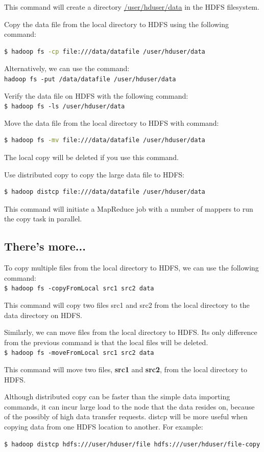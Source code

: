 This command will create a directory \url{/user/hduser/data} in the HDFS filesystem.

Copy the data file from the local directory to HDFS using the following command:
\lstset{style=bashstyle}
\begin{lstlisting}[language=bash]
$ hadoop fs -cp file:///data/datafile /user/hduser/data
\end{lstlisting}

Alternatively, we can use the command: \\
\verb|hadoop fs -put /data/datafile /user/hduser/data|

Verify the data file on HDFS with the following command: \\
\verb|$ hadoop fs -ls /user/hduser/data|

Move the data file from the local directory to HDFS with command:
\lstset{style=bashstyle}
\begin{lstlisting}[language=bash]
$ hadoop fs -mv file:///data/datafile /user/hduser/data
\end{lstlisting}

The local copy will be deleted if you use this command.

Use distributed copy to copy the large data file to HDFS:
\lstset{style=bashstyle}
\begin{lstlisting}[language=bash]
$ hadoop distcp file:///data/datafile /user/hduser/data
\end{lstlisting}
This command will initiate a MapReduce job with a number of mappers to run the copy task in parallel.
\subsection*{There's more...}
To copy multiple files from the local directory to HDFS, we can use the following command: \\
\verb|$ hadoop fs -copyFromLocal src1 src2 data|

This command will copy two files src1 and src2 from the local directory to the data directory on HDFS.

Similarly, we can move files from the local directory to HDFS. Its only difference from the previous command is that the local files will be deleted. \\
\verb|$ hadoop fs -moveFromLocal src1 src2 data|

This command will move two files, \textbf{src1} and \textbf{src2}, from the local directory to HDFS.

Although distributed copy can be faster than the simple data importing commands, it can incur large load to the node that the data resides on, because of the possibly of high data transfer requests. distcp will be more useful when copying data from one HDFS location to another. For example:
\lstset{style=bashstyle}
\begin{lstlisting}[language=bash]
$ hadoop distcp hdfs:///user/hduser/file hdfs:///user/hduser/file-copy
\end{lstlisting}
